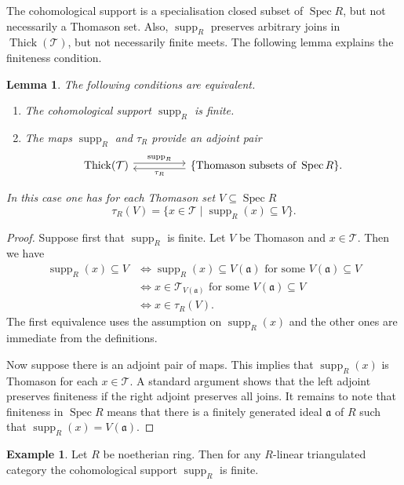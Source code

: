 \documentclass{amsart}[a4]
\newtheorem{lemma}[theorem]{Lemma}
\theoremstyle{definition}
\newtheorem{example}[theorem]{Example}
\theoremstyle{remark}
\numberwithin{equation}{section}
\newcommand{\Spec}{\operatorname{Spec}}
\newcommand{\supp}{\operatorname{supp}}
\newcommand{\Thick}{\operatorname{Thick}}
\newcommand{\cat}{\mathcal}
\newcommand{\fa}{\mathfrak{a}}
\begin{document}
The cohomological support is a specialisation closed subset of
$\Spec R$, but not necessarily a Thomason set. Also, $\supp_R$
preserves arbitrary joins in $\Thick(\cat T)$, but not necessarily
finite meets. The following lemma explains the finiteness condition.

\begin{lemma}\label{le:adjoint-supp}
  The following conditions are equivalent.
  \begin{enumerate}
  \item The cohomological support $\supp_R$ is finite.
\item The maps $\supp_R$ and $\tau_R$ provide an adjoint pair
\begin{equation*}\label{eq:supp-tau}
\begin{tikzcd}
\Thick(\cat T) \ar[rr,yshift=2.5,"\supp_R"] &&  \ar[ll,yshift=-2.5,"\tau_R"]
\{\text{Thomason subsets of }\Spec R\}.
\end{tikzcd}
\end{equation*}
\end{enumerate}
 In this case one has for each Thomason set
$V\subseteq\Spec R$
\[
\tau_R(V)=\{x\in\cat T\mid \supp_R(x)\subseteq V\}.
\]
\end{lemma}
\begin{proof}
  Suppose first that $\supp_R$ is finite.  Let $V$ be Thomason and
  $x\in \cat T$. Then we have
\begin{align*}
\supp_R(x)\subseteq V&\iff \supp_R(x)\subseteq V(\fa) \text{ for some }V(\fa)\subseteq V\\
                     &\iff x\in\cat T_{V(\fa)}\text{ for some }V(\fa)\subseteq V\\
                     &\iff  x\in\tau_R(V).
\end{align*}
The first equivalence uses the assumption on $\supp_R(x)$ and the
other ones are immediate from the definitions.

Now suppose there is an adjoint pair of maps. This implies that
$\supp_R(x)$ is Thomason for each   $x\in \cat T$. A standard argument
shows that the left adjoint preserves finiteness if the right
adjoint  preserves all joins. It remains to note that finiteness in
$\Spec R$ means that there
is a finitely generated ideal $\fa$ of $R$ such that 
$\supp_R(x)=V(\fa)$.
\end{proof}

\begin{example}
  Let $R$ be noetherian ring. Then for any $R$-linear triangulated
  category the cohomological support $\supp_R$ is finite.
\end{example}
\end{document}
